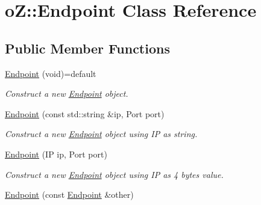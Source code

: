 \hypertarget{classo_z_1_1_endpoint}{}\section{oZ\+::Endpoint Class Reference}
\label{classo_z_1_1_endpoint}
\subsection*{Public Member Functions}
\begin{DoxyCompactItemize}
\item 
\mbox{\label{classo_z_1_1_endpoint_aa0e46ff6f1b744e9173a97680e2e20a6}} 
\mbox{\hyperlink{classo_z_1_1_endpoint_aa0e46ff6f1b744e9173a97680e2e20a6}{Endpoint}} (void)=default
\begin{DoxyCompactList}\small\item\em Construct a new \mbox{\hyperlink{classo_z_1_1_endpoint}{Endpoint}} object. \end{DoxyCompactList}\item 
\mbox{\label{classo_z_1_1_endpoint_ac7c25299f3e5bc05a54e7906d17fbfd9}} 
\mbox{\hyperlink{classo_z_1_1_endpoint_ac7c25299f3e5bc05a54e7906d17fbfd9}{Endpoint}} (const std\+::string \&ip, Port port)
\begin{DoxyCompactList}\small\item\em Construct a new \mbox{\hyperlink{classo_z_1_1_endpoint}{Endpoint}} object using IP as string. \end{DoxyCompactList}\item 
\mbox{\label{classo_z_1_1_endpoint_a7dd91554b61824eac5e0b015fa12f957}} 
\mbox{\hyperlink{classo_z_1_1_endpoint_a7dd91554b61824eac5e0b015fa12f957}{Endpoint}} (IP ip, Port port)
\begin{DoxyCompactList}\small\item\em Construct a new \mbox{\hyperlink{classo_z_1_1_endpoint}{Endpoint}} object using IP as 4 bytes value. \end{DoxyCompactList}\item 
\mbox{\label{classo_z_1_1_endpoint_a33f6c2eb724e0d60d988212bc6b66008}} 
\mbox{\hyperlink{classo_z_1_1_endpoint_a33f6c2eb724e0d60d988212bc6b66008}{Endpoint}} (const \mbox{\hyperlink{classo_z_1_1_endpoint}{Endpoint}} \&other)

\end{DoxyCompactItemize}
